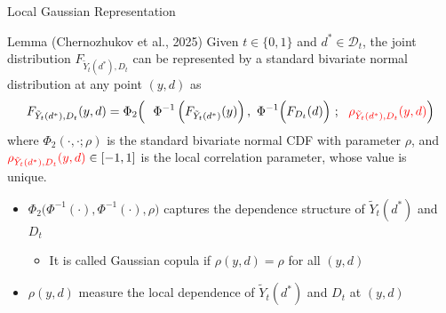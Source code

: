\documentclass[aspectratio=1610, 9pt]{beamer}
\begin{document}
\begin{frame}{Local Gaussian Representation}
\label{lemma:LGR}
    \begin{block}{Lemma (Chernozhukov et al., 2025)}
        Given $t\in\{0,1\}$ and $d^*\in\mathcal{D}_t$, the joint distribution $F_{\tilde{Y}_t(d^*),D_t}$ can be represented by a standard bivariate normal distribution at any point $(y,d)$ as
        $$F_{\tilde{Y}_{t}(d^*),D_{t}}(y,d)=\Phi_2\Big( \ 
        \ \Phi^{-1}\left(F_{\tilde{Y}_{t}(d^*)}(y) \right),\ \Phi^{-1}\Big( F_{D_t}(d)\Big) \ ;\ \ \textcolor{red}{\rho_{\tilde{Y}_{t}(d^*),D_{t}}(y,d)} \Big)$$ where $\Phi_2(\cdot,\cdot;\rho)$ is the standard bivariate normal CDF with parameter $\rho$, and $\textcolor{red}{\rho_{\tilde{Y}_{t}(d^*),D_{t}}(y,d)}\in[-1,1]$ is the local correlation parameter, whose value is unique.\ \  \hyperlink{def:LGR}{\beamergotobutton{}}
    \end{block}
    
    \vspace{0.4cm}
    \pause
    \begin{itemize}
      \item $\Phi_2\Big(\Phi^{-1}(\cdot),\Phi^{-1}(\cdot),\rho\Big)$ captures the dependence structure of $\tilde{Y}_t(d^*)$ and $D_t$
      \begin{itemize} \setlength{\leftskip}{-1em}
    \item[-] It is called Gaussian copula if $\rho(y,d)=\rho$ for all $(y,d)$
      \end{itemize}
       \item $\rho(y,d)$ measure the local dependence of $\tilde{Y}_t(d^*)$ and $D_t$ at $(y,d)$
    \end{itemize}


\end{frame}
\end{document}
